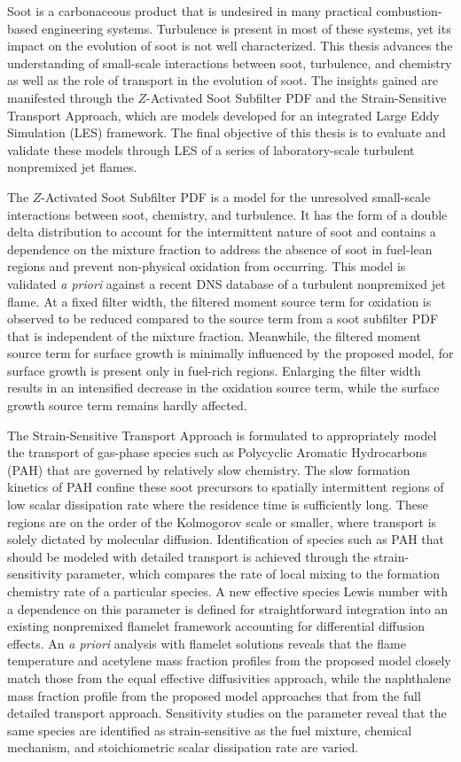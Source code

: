 Soot is a carbonaceous product that is undesired in many practical combustion-based engineering systems. Turbulence is present in most of these systems, yet its impact on the evolution of soot is not well characterized. This thesis advances the understanding of small-scale interactions between soot, turbulence, and chemistry as well as the role of transport in the evolution of soot. The insights gained are manifested through the $Z$-Activated Soot Subfilter PDF and the Strain-Sensitive Transport Approach, which are models developed for an integrated Large Eddy Simulation (LES) framework. The final objective of this thesis is to evaluate and validate these models through LES of a series of laboratory-scale turbulent nonpremixed jet flames.

The $Z$-Activated Soot Subfilter PDF is a model for the unresolved small-scale interactions between soot, chemistry, and turbulence. It has the form of a double delta distribution to account for the intermittent nature of soot and contains a dependence on the mixture fraction to address the absence of soot in fuel-lean regions and prevent non-physical oxidation from occurring. This model is validated \textit{a priori} against a recent DNS database of a turbulent nonpremixed jet flame. At a fixed filter width, the filtered moment source term for oxidation is observed to be reduced compared to the source term from a soot subfilter PDF that is independent of the mixture fraction. Meanwhile, the filtered moment source term for surface growth is minimally influenced by the proposed model, for surface growth is present only in fuel-rich regions. Enlarging the filter width results in an intensified decrease in the oxidation source term, while the surface growth source term remains hardly affected.

The Strain-Sensitive Transport Approach is formulated to appropriately model the transport of gas-phase species such as Polycyclic Aromatic Hydrocarbons (PAH) that are governed by relatively slow chemistry. The slow formation kinetics of PAH confine these soot precursors to spatially intermittent regions of low scalar dissipation rate where the residence time is sufficiently long. These regions are on the order of the Kolmogorov scale or smaller, where transport is solely dictated by molecular diffusion. Identification of species such as PAH that should be modeled with detailed transport is achieved through the strain-sensitivity parameter, which compares the rate of local mixing to the formation chemistry rate of a particular species. A new effective species Lewis number with a dependence on this parameter is defined for straightforward integration into an existing nonpremixed flamelet framework accounting for differential diffusion effects. An \textit{a priori} analysis with flamelet solutions reveals that the flame temperature and acetylene mass fraction profiles from the proposed model closely match those from the equal effective diffusivities approach, while the naphthalene mass fraction profile from the proposed model approaches that from the full detailed transport approach. Sensitivity studies on the parameter reveal that the same species are identified as strain-sensitive as the fuel mixture, chemical mechanism, and stoichiometric scalar dissipation rate are varied.

